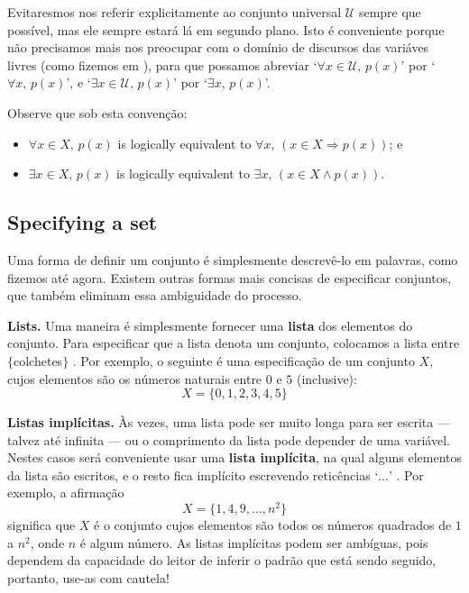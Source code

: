 Evitaresmos nos referir explicitamente ao conjunto universal $\mathcal{U}$ sempre que possível, mas ele sempre estará lá em segundo plano. Isto é conveniente porque não precisamos mais nos preocupar com o domínio de discursos das variáves livres (como fizemos em ), para que possamos abreviar `$\forall x \in \mathcal{U},\, p(x)$' por `$\forall x,\, p(x)$', e `$\exists x \in \mathcal{U},\, p(x)$' por `$\exists x,\, p(x)$'.

Observe que sob esta convenção:
\begin{itemize}
\item $\forall x \in X,\, p(x)$ is logically equivalent to $\forall x,\, (x \in X \Rightarrow p(x))$; e
\item $\exists x \in X,\, p(x)$ is logically equivalent to $\exists x,\, (x \in X \wedge p(x))$.
\end{itemize}

\subsection*{Specifying a set}
Uma forma de definir um conjunto é simplesmente descrevê-lo em palavras, como fizemos até agora. Existem outras formas mais concisas de especificar conjuntos, que também eliminam essa ambiguidade do processo.

\textbf{Lists.}
Uma maneira é simplesmente fornecer uma \textbf{lista} dos elementos do conjunto. Para especificar que a lista denota um conjunto, colocamos a lista entre $\{$colchetes$\}$ \lindexmmc{\{\dots\textbackslash{}\}}{$\{\dots\}$}. Por exemplo, o seguinte é uma especificação de um conjunto $X$, cujos elementos são os números naturais entre $0$ e $5$ (inclusive):
\[ X = \{ 0, 1, 2, 3, 4, 5 \} \]

\textbf{Listas implícitas.}
Às vezes, uma lista pode ser muito longa para ser escrita — talvez até infinita — ou o comprimento da lista pode depender de uma variável. Nestes casos será conveniente usar uma \textbf{lista implícita}, na qual alguns elementos da lista são escritos, e o resto fica implícito escrevendo reticências `$\dots$'  . Por exemplo, a afirmação
\[ X = \{ 1, 4, 9, \dots, n^2 \} \]
significa que $X$ é o conjunto cujos elementos são todos os números quadrados de $1$ a $n^2$, onde $n$ é algum número. As listas implícitas podem ser ambíguas, pois dependem da capacidade do leitor de inferir o padrão que está sendo seguido, portanto, use-as com cautela!

